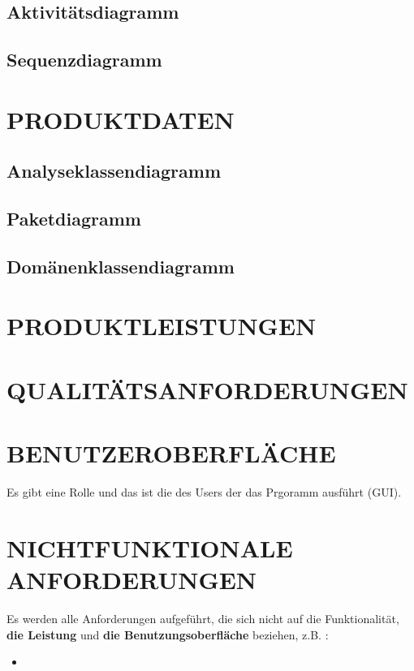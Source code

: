 	\subsection{Aktivitätsdiagramm}
		
	\subsection{Sequenzdiagramm}
	
	
\newpage
	\section{\Large PRODUKTDATEN}

	\subsection{Analyseklassendiagramm}	

	\subsection{Paketdiagramm}

	\subsection{Domänenklassendiagramm}

	\section{\Large PRODUKTLEISTUNGEN}

	\section{\Large QUALITÄTSANFORDERUNGEN}

	
	\section{\Large BENUTZEROBERFLÄCHE}
	Es gibt eine Rolle und das ist die des Users der das Prgoramm ausführt (GUI).

	\section{\Large NICHTFUNKTIONALE ANFORDERUNGEN}
	Es werden alle Anforderungen aufgeführt, die sich nicht auf die Funktionalität, \textbf{ die Leistung} und \textbf{ die Benutzungsoberfläche} beziehen, z.B. :
	\begin{itemize}
		\item
	\end{itemize} 

